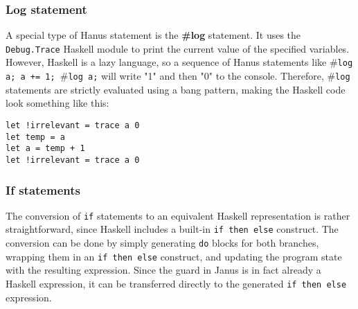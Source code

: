 \documentclass[12pt,a4paper]{article}
\newcommand{\inlinecode}[1]{\texttt{#1}}
\begin{document}
\subsubsection{Log statement}
A special type of Hanus statement is the \textbf{\#log} statement. It uses the \inlinecode{Debug.Trace} Haskell module to print the current value of the specified variables. However, Haskell is a lazy language, so a sequence of Hanus statements like \#\inlinecode{log a; a += 1; }\#\inlinecode{log a;} will write "1" and then "0" to the console. Therefore, \#\inlinecode{log} statements are strictly evaluated using a bang pattern, making the Haskell code look something like this:

\begin{verbatim}
let !irrelevant = trace a 0
let temp = a
let a = temp + 1
let !irrelevant = trace a 0
\end{verbatim}

\subsubsection{If statements}
The conversion of \texttt{if} statements to an equivalent Haskell representation is rather straightforward, since Haskell includes a built-in \texttt{if then else} construct. The conversion can be done by simply generating \texttt{do} blocks for both branches, wrapping them in an \texttt{if then else} construct, and updating the program state with the resulting expression. Since the guard in Janus is in fact already a Haskell expression, it can be transferred directly to the generated \texttt{if then else} expression. 
\end{document}

